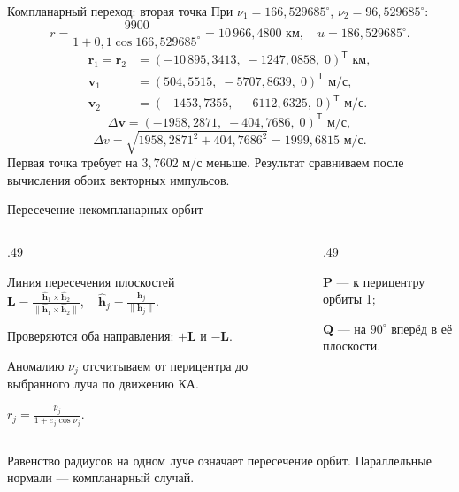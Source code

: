 \documentclass[11pt,aspectratio=169,t]{beamer}
\begin{document}
\begin{frame}{Компланарный переход: вторая точка}
При $\nu_1=166{,}529685^\circ$, $\nu_2=96{,}529685^\circ$:
\[
r=\frac{9900}{1+0{,}1\cos166{,}529685^\circ}
=10\,966{,}4800\text{ км},\quad u=186{,}529685^\circ.
\]
\begin{align*}
\mathbf r_1=\mathbf r_2&=(-10\,895{,}3413,\;-1247{,}0858,\;0)^{\mathsf T}\text{ км},\\
\mathbf v_1&=(504{,}5515,\;-5707{,}8639,\;0)^{\mathsf T}\text{ м/с},\\
\mathbf v_2&=(-1453{,}7355,\;-6112{,}6325,\;0)^{\mathsf T}\text{ м/с}.
\end{align*}
\[
\Delta\mathbf v=(-1958{,}2871,\;-404{,}7686,\;0)^{\mathsf T}\text{ м/с},
\]
\[
\Delta v=\sqrt{1958{,}2871^2+404{,}7686^2}=1999{,}6815\text{ м/с}.
\]
\justifying
Первая точка требует на $3{,}7602$ м/с меньше. Результат сравниваем
после вычисления обоих векторных импульсов.
\end{frame}

\begin{frame}{Пересечение некомпланарных орбит}
\begin{columns}[T,onlytextwidth]
\begin{column}{.49\textwidth}
\begin{block}{Линия пересечения плоскостей}
\centering
$\displaystyle\mathbf L=
\frac{\widehat{\mathbf h}_1\times\widehat{\mathbf h}_2}
{\|\widehat{\mathbf h}_1\times\widehat{\mathbf h}_2\|},\quad
\widehat{\mathbf h}_j=\frac{\mathbf h_j}{\|\mathbf h_j\|}.$
\end{block}
\justifying
Проверяются оба направления:
$+\mathbf L$ и $-\mathbf L$.
\par\smallskip
Аномалию $\nu_j$ отсчитываем от перицентра до выбранного луча по движению КА.
\par\smallskip
$\displaystyle r_j=\frac{p_j}{1+e_j\cos\nu_j}$.
\end{column}
\begin{column}{.49\textwidth}
\centering\par
{\color{coursemuted}
$\mathbf P$ --- к перицентру орбиты 1;\par
$\mathbf Q$ --- на $90^\circ$ вперёд в её плоскости.\par}
\end{column}
\end{columns}
\smallskip
\justifying
Равенство радиусов на одном луче означает пересечение орбит.
Параллельные нормали — компланарный случай.
\end{frame}
\end{document}
